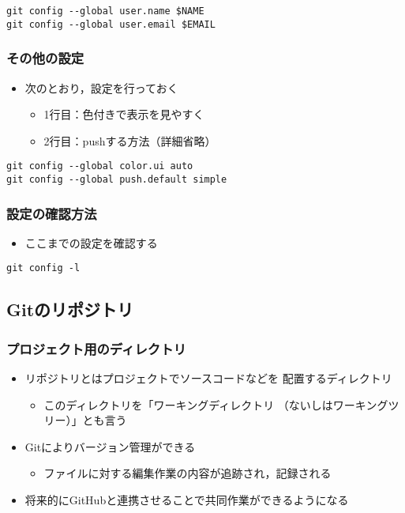 \documentclass[a4paper,twoside,twocolumn]{bxjsarticle}
\begin{document}
\begin{verbatim}
git config --global user.name $NAME
git config --global user.email $EMAIL
\end{verbatim}

\subsubsection{その他の設定}
\label{sec-1-1-4}
\begin{itemize}
\item 次のとおり，設定を行っておく
\begin{itemize}
\item 1行目：色付きで表示を見やすく
\item 2行目：pushする方法（詳細省略）
\end{itemize}
\end{itemize}

\begin{verbatim}
git config --global color.ui auto
git config --global push.default simple
\end{verbatim}

\subsubsection{設定の確認方法}
\label{sec-1-1-5}
\begin{itemize}
\item ここまでの設定を確認する
\end{itemize}

\begin{verbatim}
git config -l
\end{verbatim}

\subsection{Gitのリポジトリ}
\label{sec-1-2}
\subsubsection{プロジェクト用のディレクトリ}
\label{sec-1-2-1}
\begin{itemize}
\item リポジトリとはプロジェクトでソースコードなどを
配置するディレクトリ
\begin{itemize}
\item このディレクトリを「ワーキングディレクトリ
（ないしはワーキングツリー）」とも言う
\end{itemize}
\item Gitによりバージョン管理ができる
\begin{itemize}
\item ファイルに対する編集作業の内容が追跡され，記録される
\end{itemize}
\item 将来的にGitHubと連携させることで共同作業ができるようになる
\end{itemize}
\end{document}
